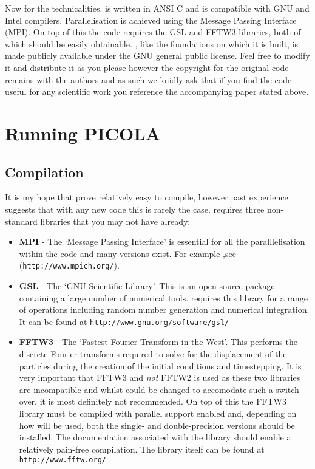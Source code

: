 \documentclass[12pt,twoside,a4paper]{article}
\begin{document}
Now for the technicalities. {\PICOLA} is written in ANSI C and is compatible with GNU and Intel compilers. Parallelisation is achieved using the Message Passing Interface (MPI). On top of this the code requires the GSL and FFTW3 libraries, both of which should be easily obtainable. {\PICOLA}, like the foundations on which it is built, is made publicly available under the GNU general public license. Feel free to modify it and distribute it as you please however the copyright for the original code remains with the authors and as such we knidly ask that if you find the code useful for any scientific work you reference the accompanying paper stated above.

\section{Running PICOLA}
\subsection{Compilation}
It is my hope that {\PICOLA} prove relatively easy to compile, however past experience suggests that with any new code this is rarely the case. {\PICOLA} requires three non-standard libraries that you may not have already:
\begin{itemize}
  \item{\textbf{MPI} - The `Message Passing Interface' is essential for all the paralllelisation within the code and many versions exist. For example ,see {\MPICH} (\texttt{http://www.mpich.org/}).}
  \item{\textbf{GSL} - The `GNU Scientific Library'. This is an open source package containing a large number of numerical tools. {\PICOLA} requires this library for a range of operations including random number generation and numerical integration. It can be found at \texttt{http://www.gnu.org/software/gsl/}}
  \item{\textbf{FFTW3} - The `Fastest Fourier Transform in the West'. This performs the discrete Fourier transforms required to solve for the displacement of the particles during the creation of the initial conditions and timestepping. It is very important that FFTW3 and \emph{not} FFTW2 is used as these two libraries are incompatible and whilst {\PICOLA} could be changed to accomodate such a switch over, it is most definitely not recommended. On top of this the FFTW3 library must be compiled with parallel support enabled and, depending on how {\PICOLA} will be used, both the single- and double-precision versions should be installed. The documentation associated with the library should enable a relatively pain-free compilation. The library itself can be found at \texttt{http://www.fftw.org/}}
\end{itemize}
\end{document}
